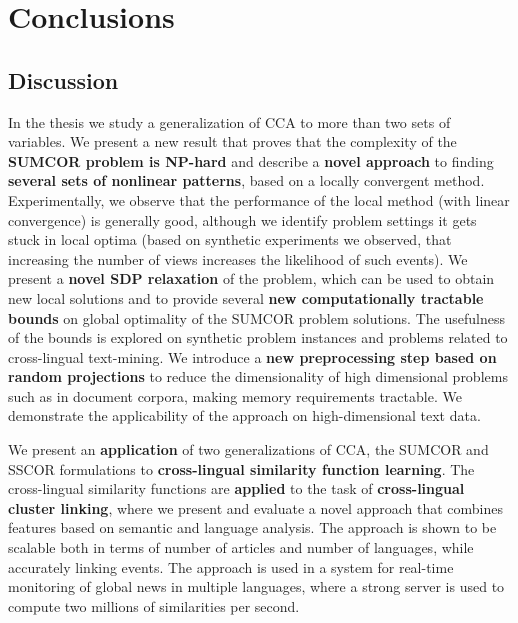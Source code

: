 %
\chapter{Conclusions}\label{chap:conclusions}

\section{Discussion}

In the thesis we study a generalization of CCA to more than two
sets of variables. We present a new result that proves that
the complexity of the \textbf{SUMCOR problem
is NP-hard} and describe a \textbf{novel approach} to finding \textbf{several sets
of nonlinear patterns}, based on a locally convergent method.
Experimentally, we observe that the
performance of the local method (with linear convergence) is
generally good, although we identify problem settings it gets
stuck in local optima (based on synthetic experiments we observed,
that increasing the number of views increases the likelihood of such events).
We present a \textbf{novel SDP relaxation} of the problem, which can be used to obtain new
local solutions and to provide several \textbf{new computationally tractable bounds} on
global optimality of the SUMCOR problem solutions.
The usefulness of the bounds is explored on synthetic problem
instances and problems related to cross-lingual text-mining.
We introduce a \textbf{new preprocessing step based on random
projections} to reduce the dimensionality of high dimensional problems
such as in document corpora, making memory requirements tractable.
We demonstrate the applicability of the approach on high-dimensional
text data.

We present an \textbf{application} of two generalizations of CCA, the
SUMCOR and SSCOR formulations to \textbf{cross-lingual similarity function
learning}. The cross-lingual similarity functions are \textbf{applied} to
the task of \textbf{cross-lingual cluster linking}, where we present and evaluate a novel
approach that combines features based on semantic and language analysis.
The approach is shown to be scalable both in
terms of number of articles and number of languages, while accurately linking events.
The approach is used in a system for real-time monitoring of global news in
multiple languages, where a strong server is used to compute two millions
of similarities per second.

